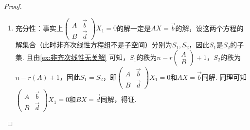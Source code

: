 \begin{proof}
\begin{enumerate}
        \item 充分性：事实上$\begin{pmatrix}
                      A & \vec{b} \\ B & \vec{d}
                  \end{pmatrix}X_1=0$的解一定是$AX=\vec{b}$的解，设这两个方程的解集合（此时非齐次线性方程组不是子空间）分别为$S_1,S_2$，因此$S_1$是$S_2$的子集. 且由\autoref{ex:非齐次线性无关解} 可知，$S_1$的秩为$n-r\begin{pmatrix}
                      A \\ B
                  \end{pmatrix}+1$，$S_2$的秩为$n-r(A)+1$，因此$S_1=S_2$，即$\begin{pmatrix}
                      A & \vec{b} \\ B & \vec{d}
                  \end{pmatrix}X_1=0$和$AX=\vec{b}$同解. 同理可知$\begin{pmatrix}
                      A & \vec{b} \\ B & \vec{d}
                  \end{pmatrix}X_1=0$和$BX=\vec{d}$同解，得证.
    \end{enumerate}
\end{proof}

